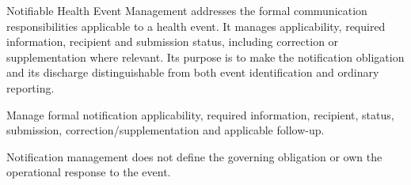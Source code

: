 Notifiable Health Event Management addresses the formal communication responsibilities applicable to a health event. It manages applicability, required information, recipient and submission status, including correction or supplementation where relevant. Its purpose is to make the notification obligation and its discharge distinguishable from both event identification and ordinary reporting.



Manage formal notification applicability, required information, recipient, status, submission, correction/\allowbreak{}supplementation and applicable follow-up.



Notification management does not define the governing obligation or own the operational response to the event.


